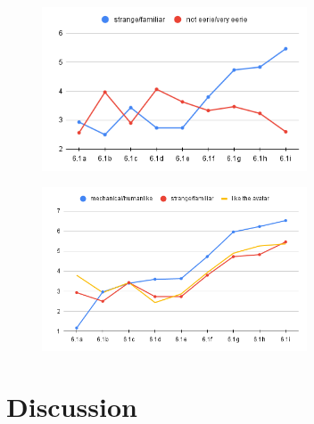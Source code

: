 \begin{figure} %
    \centering
    \includegraphics[width=0.7\textwidth]{graphics/result/result2.png}
    \caption{}
    \label{fig:result2}
\end{figure}

\begin{figure} %
    \centering
    \includegraphics[width=0.7\textwidth]{graphics/result/result4.png}
    \caption{}
    \label{fig:result4}
\end{figure}


\section{Discussion}

